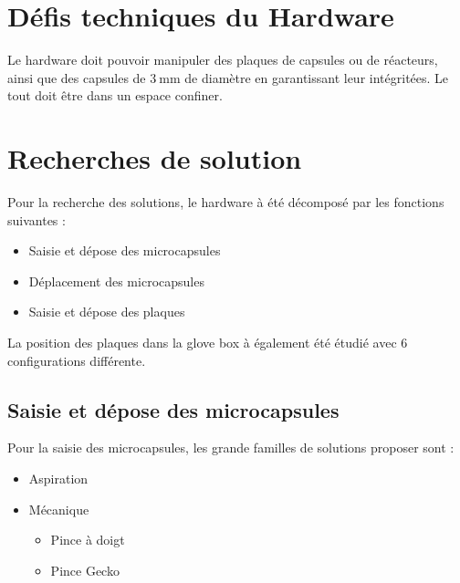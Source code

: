 \section{Défis techniques du Hardware}
Le hardware doit pouvoir manipuler des plaques de capsules ou de réacteurs, ainsi que des capsules de $\qty{3}{\mm}$ de diamètre en garantissant leur intégritées. Le tout doit être dans un espace confiner.
\section{Recherches de solution}
Pour la recherche des solutions, le hardware à été décomposé par les fonctions suivantes : 
\begin{itemize}
    \item Saisie et dépose des microcapsules
    \item Déplacement des microcapsules
    \item Saisie et dépose des plaques
\end{itemize} 
La position des plaques dans la glove box à également été étudié avec $6$ configurations différente.
\subsection{Saisie et dépose des microcapsules}
Pour la saisie des microcapsules, les grande familles de solutions proposer sont : 
\begin{itemize}
    \item Aspiration
    \item Mécanique \begin{itemize}
        \item Pince à doigt
        \item Pince Gecko
    \end{itemize}
\end{itemize}
